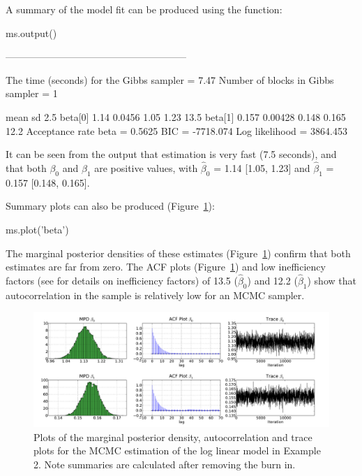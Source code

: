 \documentclass[article]{jss}
\begin{document}
A summary of the model fit can be produced using the  function:
\begin{CodeChunk}
\begin{CodeInput}
ms.output()
\end{CodeInput}
\begin{CodeOutput}

--------------------------------------------------------

The time (seconds) for the Gibbs sampler =  7.47
Number of blocks in Gibbs sampler =  1

                mean        sd       2.5%
   beta[0]      1.14    0.0456       1.05      1.23       13.5
   beta[1]     0.157   0.00428      0.148     0.165       12.2
Acceptance rate  beta  =  0.5625
BIC =  -7718.074
Log likelihood =  3864.453
\end{CodeOutput}
\end{CodeChunk}

It can be seen from the output that estimation is very fast (7.5
seconds), and that both $\beta_{0}$ and $\beta_{1}$ are positive
values, with $\hat{\beta}_{0}$ = 1.14 {[}1.05, 1.23{]} and
$\hat{\beta}_{1}$ = 0.157 {[}0.148, 0.165{]}. 

Summary plots can also be produced (Figure~\ref{fig:plot_output_eg2}):
\begin{CodeChunk}
\begin{CodeInput}
ms.plot('beta')
\end{CodeInput}
\end{CodeChunk}

The marginal posterior densities of these estimates
(Figure~\ref{fig:plot_output_eg2}) confirm that both estimates are far
from zero. The ACF plots (Figure~\ref{fig:plot_output_eg2}) and low
inefficiency factors (see \citet{ChibGreenberg1996} for details on
inefficiency factors) of 13.5 ($\hat{\beta}_{0}$) and 12.2
($\hat{\beta}_{1}$) show that autocorrelation in the sample is
relatively low for an MCMC sampler. %
\begin{figure}[t!]
  \begin{center}
    \includegraphics[width=16cm]{ex_loglinear.pdf}
  \end{center}
  \caption{Plots of the marginal posterior density, autocorrelation
    and trace plots for the MCMC estimation of the log linear model in
    Example 2. Note summaries are calculated after removing the burn
    in.}
\label{fig:plot_output_eg2}
\end{figure}
\end{document}

